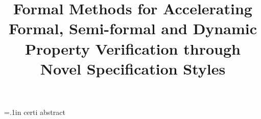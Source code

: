 \documentclass[envcountsame,envcountchap]{svmono}
\begin{document}
\title{Formal Methods for Accelerating Formal, Semi-formal
    and Dynamic Property Verification through Novel Specification Styles}
\date{}
\maketitle

\frontmatter%


%

\tableofcontents

\parskip=.1in
\mainmatter
 {certi}
 {abstract}

%

%
%
%
%
%
%
%
%


%
%
\mbox{}
\end{document}
